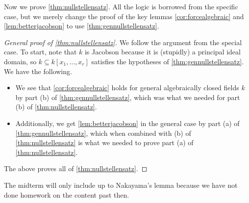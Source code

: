 \documentclass[../notes.tex]{subfiles}
\begin{document}
\noindent Now we prove \autoref{thm:nullstellensatz}. All the logic is borrowed from the specific case, but we merely change the proof of the key lemmas \autoref{cor:forcealgebraic} and \autoref{lem:betterjacobson} to use \autoref{thm:gennullstellensatz}.
\begin{proof}[General proof of \autoref{thm:nullstellensatz}]
	We follow the argument from the special case. To start, note that $k$ is Jacobson because it is (stupidly) a principal ideal domain, so $k\subseteq k[x_1,\ldots,x_r]$ satisfies the hypotheses of \autoref{thm:gennullstellensatz}. We have the following.
	\begin{itemize}
		\item We see that \autoref{cor:forcealgebraic} holds for general algebraically closed fields $k$ by part (b) of \autoref{thm:gennullstellensatz}, which was what we needed for part (b) of \autoref{thm:nullstellensatz}.
		\item Additionally, we get \autoref{lem:betterjacobson} in the general case by part (a) of \autoref{thm:gennullstellensatz}, which when combined with (b) of \autoref{thm:nullstellensatz} is what we needed to prove part (a) of \autoref{thm:nullstellensatz}.
	\end{itemize}
	The above proves all of \autoref{thm:nullstellensatz}.
\end{proof}
\begin{remark}
	The midterm will only include up to Nakayama's lemma because we have not done homework on the content past then.
\end{remark}
\end{document}
